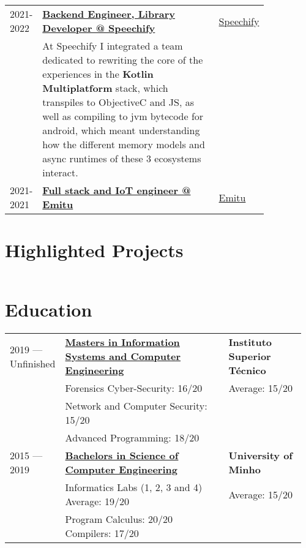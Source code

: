 \documentclass{article}
\newcommand{\ul}[1]{\underline{#1}}
\begin{document}
\begin{tabular}{p{0.11\linewidth}p{0.73\linewidth}l}
    2021-2022 & \ul{\textbf{Backend Engineer, Library Developer @ Speechify}} & \href{https://speechify.com}{Speechify} \\
    &
        At Speechify I integrated a team dedicated to rewriting the core
        of the experiences in the \textbf{Kotlin Multiplatform} stack, which transpiles to
        ObjectiveC and JS, as well as compiling to jvm bytecode for android,
        which meant understanding how the different memory models and async
        runtimes of these 3 ecosystems interact.
    & \\

    2021-2021 & \ul{\textbf{Full stack and IoT engineer @ Emitu}} & \href{https://emitu.com}{Emitu} \\

\end{tabular}

\section{Highlighted Projects}

\begin{tabular}{p{0.11\linewidth}p{0.73\linewidth}l}
\end{tabular}

\section{Education}

\begin{tabular}{p{0.15\linewidth}p{0.55\linewidth}p{0.26\linewidth}}

    2019 --- Unfinished &
        \ul{\textbf{Masters in Information Systems and Computer Engineering}}
    &
        \textbf{Instituto Superior Técnico}
    \\
    & Forensics Cyber-Security: 16/20 & Average: 15/20 \\
    & Network and Computer Security: 15/20 &\\
    & Advanced Programming: 18/20 &\\

    2015 --- 2019
    &
        \ul{\textbf{Bachelors in Science of Computer Engineering}}
    &
        \textbf{University of Minho}
    \\
    & Informatics Labs (1, 2, 3 and 4) Average: 19/20 & Average: 15/20 \\
    & Program Calculus: 20/20 \hspace{2em} Compilers: 17/20 &\\

\end{tabular}


\end{document}
